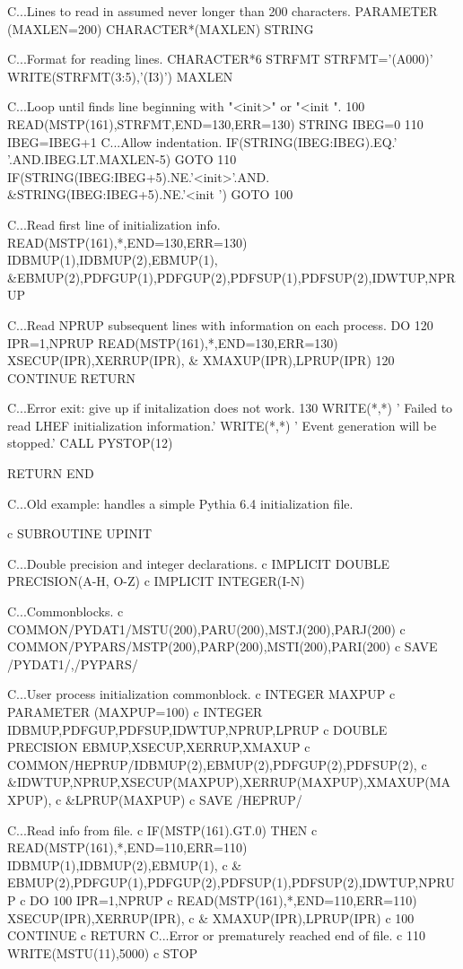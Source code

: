 C...Lines to read in assumed never longer than 200 characters.
      PARAMETER (MAXLEN=200)
      CHARACTER*(MAXLEN) STRING

C...Format for reading lines.
      CHARACTER*6 STRFMT
      STRFMT='(A000)'
      WRITE(STRFMT(3:5),'(I3)') MAXLEN

C...Loop until finds line beginning with "<init>" or "<init ".
  100 READ(MSTP(161),STRFMT,END=130,ERR=130) STRING
      IBEG=0
  110 IBEG=IBEG+1
C...Allow indentation.
      IF(STRING(IBEG:IBEG).EQ.' '.AND.IBEG.LT.MAXLEN-5) GOTO 110
      IF(STRING(IBEG:IBEG+5).NE.'<init>'.AND.
     &STRING(IBEG:IBEG+5).NE.'<init ') GOTO 100

C...Read first line of initialization info.
      READ(MSTP(161),*,END=130,ERR=130) IDBMUP(1),IDBMUP(2),EBMUP(1),
     &EBMUP(2),PDFGUP(1),PDFGUP(2),PDFSUP(1),PDFSUP(2),IDWTUP,NPRUP

C...Read NPRUP subsequent lines with information on each process.
      DO 120 IPR=1,NPRUP
        READ(MSTP(161),*,END=130,ERR=130) XSECUP(IPR),XERRUP(IPR),
     &  XMAXUP(IPR),LPRUP(IPR)
  120 CONTINUE
      RETURN

C...Error exit: give up if initalization does not work.
  130 WRITE(*,*) ' Failed to read LHEF initialization information.'
      WRITE(*,*) ' Event generation will be stopped.'
      CALL PYSTOP(12)

      RETURN
      END

C...Old example: handles a simple Pythia 6.4 initialization file.

c      SUBROUTINE UPINIT

C...Double precision and integer declarations.
c      IMPLICIT DOUBLE PRECISION(A-H, O-Z)
c      IMPLICIT INTEGER(I-N)

C...Commonblocks.
c      COMMON/PYDAT1/MSTU(200),PARU(200),MSTJ(200),PARJ(200)
c      COMMON/PYPARS/MSTP(200),PARP(200),MSTI(200),PARI(200)
c      SAVE /PYDAT1/,/PYPARS/

C...User process initialization commonblock.
c      INTEGER MAXPUP
c      PARAMETER (MAXPUP=100)
c      INTEGER IDBMUP,PDFGUP,PDFSUP,IDWTUP,NPRUP,LPRUP
c      DOUBLE PRECISION EBMUP,XSECUP,XERRUP,XMAXUP
c      COMMON/HEPRUP/IDBMUP(2),EBMUP(2),PDFGUP(2),PDFSUP(2),
c     &IDWTUP,NPRUP,XSECUP(MAXPUP),XERRUP(MAXPUP),XMAXUP(MAXPUP),
c     &LPRUP(MAXPUP)
c      SAVE /HEPRUP/

C...Read info from file.
c      IF(MSTP(161).GT.0) THEN
c        READ(MSTP(161),*,END=110,ERR=110) IDBMUP(1),IDBMUP(2),EBMUP(1),
c     &  EBMUP(2),PDFGUP(1),PDFGUP(2),PDFSUP(1),PDFSUP(2),IDWTUP,NPRUP
c        DO 100 IPR=1,NPRUP
c          READ(MSTP(161),*,END=110,ERR=110) XSECUP(IPR),XERRUP(IPR),
c     &    XMAXUP(IPR),LPRUP(IPR)
c  100   CONTINUE
c        RETURN
C...Error or prematurely reached end of file.
c  110   WRITE(MSTU(11),5000)
c        STOP

